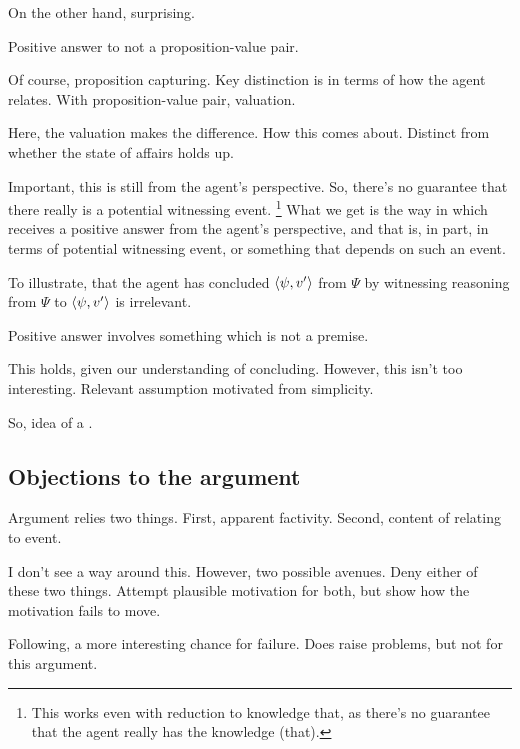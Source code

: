 \begin{note}
  On the other hand, surprising.

  \begin{corollary}
    Positive answer to \qzS{} not a proposition-value pair.
  \end{corollary}
  Of course, proposition capturing.
  Key distinction is in terms of how the agent relates.
  With proposition-value pair, valuation.

  Here, the valuation makes the difference.
  How this comes about.
  Distinct from whether the state of affairs holds up.

  Important, this is still from the agent's perspective.
  So, there's no guarantee that there really is a potential witnessing event.%
  \footnote{
    This works even with reduction to knowledge that, as there's no guarantee that the agent really has the knowledge (that).
  }
  What we get is the way in which \qzS{} receives a positive answer from the agent's perspective, and that is, in part, in terms of potential witnessing event, or something that depends on such an event.
\end{note}

\begin{note}
  To illustrate, that the agent has concluded \(\langle \psi, v' \rangle\) from \(\Psi\) by witnessing reasoning from \(\Psi\) to \(\langle \psi, v' \rangle\) is irrelevant.
\end{note}

\begin{note}
  \begin{corollary}
    Positive answer involves something which is not a premise.
  \end{corollary}

  This holds, given our understanding of concluding.
  However, this isn't too interesting.
  Relevant assumption motivated from simplicity.
\end{note}

\begin{note}
  So, idea of a \fc{}.
\end{note}

\subsection{Objections to the argument}
\label{sec:objections-argument}

\begin{note}
  Argument relies two things.
  First, apparent factivity.
  Second, content of \qzS{} relating to event.

  I don't see a way around this.
  However, two possible avenues.
  Deny either of these two things.
  Attempt plausible motivation for both, but show how the motivation fails to move.

  Following, a more interesting chance for failure.
  Does raise problems, but not for this argument.
\end{note}

